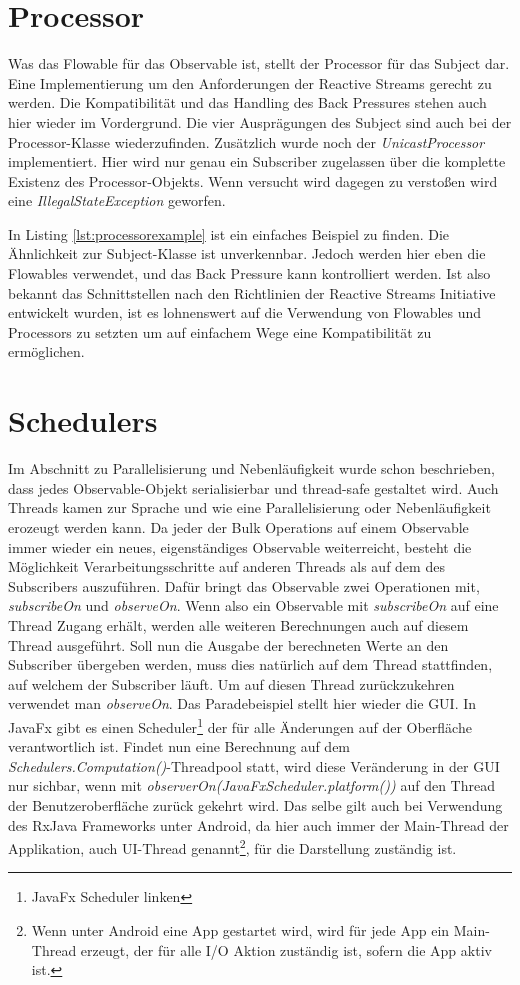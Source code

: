 \section{Processor}
Was das Flowable für das Observable ist, stellt der Processor für das Subject dar. Eine Implementierung um den Anforderungen der Reactive Streams gerecht zu werden. Die Kompatibilität und das Handling des Back Pressures stehen auch hier wieder im Vordergrund. Die vier Ausprägungen des Subject sind auch bei der Processor-Klasse wiederzufinden. Zusätzlich wurde noch der \textit{UnicastProcessor} implementiert. Hier wird nur genau ein Subscriber zugelassen über die komplette Existenz des Processor-Objekts. Wenn versucht wird dagegen zu verstoßen wird eine \textit{IllegalStateException} geworfen.

In Listing \ref{lst:processorexample} ist ein einfaches Beispiel zu finden. Die Ähnlichkeit zur Subject-Klasse ist unverkennbar. Jedoch werden hier eben die Flowables verwendet, und das Back Pressure kann kontrolliert werden. Ist also bekannt das Schnittstellen nach den Richtlinien der Reactive Streams Initiative entwickelt wurden, ist es lohnenswert auf die Verwendung von Flowables und Processors zu setzten um auf einfachem Wege eine Kompatibilität zu ermöglichen.
\section{Schedulers}
Im Abschnitt zu Parallelisierung und Nebenläufigkeit wurde schon beschrieben, dass jedes Observable-Objekt serialisierbar und thread-safe gestaltet wird. Auch Threads kamen zur Sprache und wie eine Parallelisierung oder Nebenläufigkeit erozeugt werden kann. Da jeder der Bulk Operations auf einem Observable immer wieder ein neues, eigenständiges Observable weiterreicht, besteht die Möglichkeit Verarbeitungsschritte auf anderen Threads als auf dem des Subscribers auszuführen. Dafür bringt das Observable zwei Operationen mit, \textit{subscribeOn} und \textit{observeOn}. Wenn also ein Observable mit \textit{subscribeOn} auf eine Thread Zugang erhält, werden alle weiteren Berechnungen auch auf diesem Thread ausgeführt. Soll nun die Ausgabe der berechneten Werte an den Subscriber übergeben werden, muss dies natürlich auf dem Thread stattfinden, auf welchem der Subscriber läuft. Um auf diesen Thread zurückzukehren verwendet man \textit{observeOn}. Das Paradebeispiel stellt hier wieder die GUI. In JavaFx gibt es einen Scheduler\footnote{JavaFx Scheduler linken} der für alle Änderungen auf der Oberfläche verantwortlich ist. Findet nun eine Berechnung auf dem \textit{Schedulers.Computation()}-Threadpool statt, wird diese Veränderung in der GUI nur sichbar, wenn mit \textit{observerOn(JavaFxScheduler.platform())} auf den Thread der Benutzeroberfläche zurück gekehrt wird. Das selbe gilt auch bei Verwendung des RxJava Frameworks unter Android, da hier auch immer der Main-Thread der Applikation, auch UI-Thread genannt\footnote{Wenn unter Android eine App gestartet wird, wird für jede App ein Main-Thread erzeugt, der für alle I/O Aktion zuständig ist, sofern die App aktiv ist.}, für die Darstellung zuständig ist.

